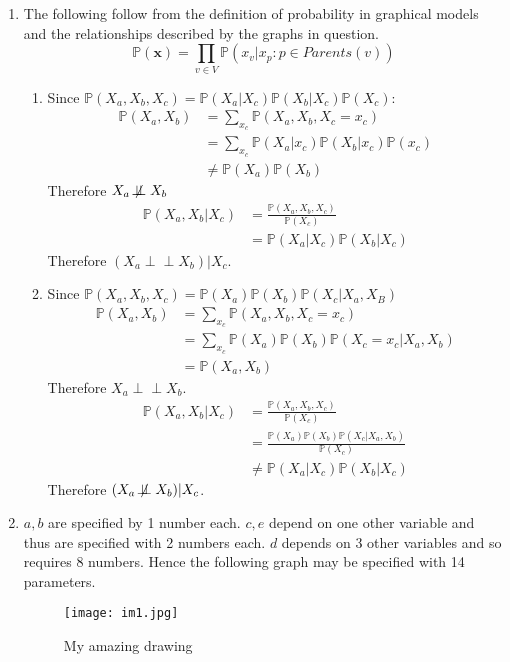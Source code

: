 \documentclass[10pt]{article}
\theoremstyle{definition}
\theoremstyle{remark}
\def\P{\mathbb{P}}
\def\bx{\mathbf{x}}
\def\indep{\!\perp\!\!\!\perp}
\newcommand{\al}[1]{\begin{align*}#1\end{align*}}
\begin{document}
\begin{enumerate}
\begin{enumerate}
    \end{enumerate}
    \item
    The following follow from the definition of probability in graphical
    models and the relationships described by the graphs in question.
    $$
        \P(\bx) = \prod_{v\in V}\P(x_v | x_p : p \in Parents(v))
    $$
    \begin{enumerate}
        \item Since $\P(X_a,X_b,X_c) = \P(X_a|X_c)\P(X_b|X_c)\P(X_c)$:
        \al{
            \P(X_a,X_b) &= \sum_{x_c}\P(X_a,X_b,X_c=x_c) \\
                & = \sum_{x_c} \P(X_a|x_c)\P(X_b|x_c)\P(x_c) \\
                &\not= \P(X_a)\P(X_b)
        }
        Therefore $ X_a \not\indep X_b$
        \al{
            \P(X_a,X_b | X_c)
                &= \frac{\P(X_a,X_b,X_c)}{\P(X_c)} \\
                &= \P(X_a|X_c)\P(X_b|X_c)
        }
        Therefore $(X_a \indep X_b) | X_c$.

        \item Since $\P(X_a,X_b,X_c) = \P(X_a)\P(X_b)\P(X_c | X_a,X_B)$
        \al{
            \P(X_a,X_b)
                &= \sum_{x_c}\P(X_a,X_b,X_c=x_c) \\
                &= \sum_{x_c}\P(X_a)\P(X_b)\P(X_c=x_c |X_a,X_b) \\
                &= \P(X_a,X_b)
        }
        Therefore $X_a\indep X_b$.
        \al{
            \P(X_a,X_b|X_c)
                &= \frac{\P(X_a,X_b,X_c)}{\P(X_c)}\\
                &= \frac{\P(X_a)\P(X_b)\P(X_c|X_a,X_b)}{\P(X_c)}  \\
                &\not= \P(X_a| X_c) \P(X_b | X_c)
        }
        Therefore $(X_a\not\indep X_b)|X_c$.

    \end{enumerate}

    \item $a,b$ are specified by 1 number each. $c,e$ depend on one other
    variable and thus are specified with 2 numbers each. $d$ depends on
    3 other variables and so requires 8 numbers. Hence the following graph may
    be specified with 14 parameters.

    \begin{figure}[H]
        \vspace{4cm}
        \center
        \texttt{[image: im1.jpg]}

        \caption{My amazing drawing}
    \end{figure}


\end{enumerate}
\end{document}
